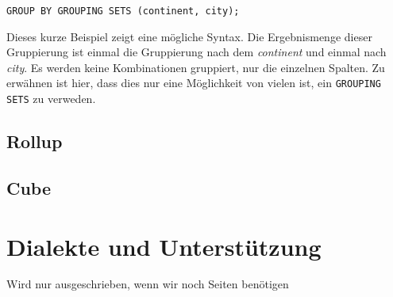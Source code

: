 \texttt{GROUP BY GROUPING SETS (continent, city);}

Dieses kurze Beispiel zeigt eine mögliche Syntax. Die Ergebnismenge dieser
Gruppierung ist einmal die Gruppierung nach dem \textit{continent} und einmal nach
\textit{city}. Es werden keine Kombinationen gruppiert, nur die einzelnen
Spalten. Zu erwähnen ist hier, dass dies nur eine Möglichkeit von vielen ist, ein
\texttt{GROUPING SETS} zu verweden.

\subsection{Rollup}

\subsection{Cube}


\section{Dialekte und Unterstützung}
Wird nur ausgeschrieben, wenn wir noch Seiten benötigen